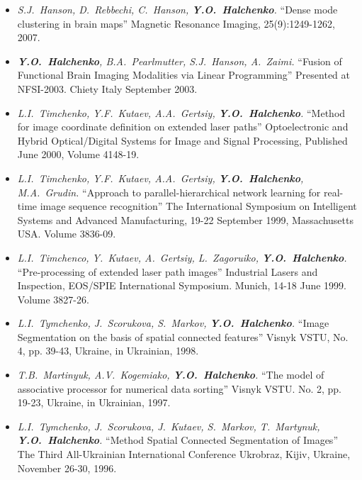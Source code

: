 \documentclass[12pt,overlapped,line]{res}
\newcommand{\mtitle}[1]{``#1''}
\newcommand{\mauthors}[1]{ \textit{#1.}}
\newcommand{\mwhere}[1]{#1.}
\begin{document}
\begin{resume}
\begin{itemize}
  \item
    \mauthors{S.J.~Hanson, D.~Rebbechi, C.~Hanson, \textbf{Y.O.~Halchenko}}
    \mtitle{Dense mode clustering in brain maps}
    \mwhere{Magnetic Resonance Imaging, 25(9):1249-1262, 2007}

  \item
     \mauthors{\textbf{Y.O.~Halchenko}, B.A.~Pearlmutter, S.J.~Hanson, A.~Zaimi}
     \mtitle{Fusion of Functional Brain Imaging Modalities via Linear Programming}
     \mwhere{Presented at NFSI-2003. Chiety Italy September 2003}

  \item
     \mauthors{L.I.~Timchenko, Y.F.~Kutaev, A.A.~Gertsiy, \textbf{Y.O.~Halchenko}}
     \mtitle{Method for image coordinate definition on extended laser paths}
     \mwhere{Optoelectronic and Hybrid Optical/Digital Systems for Image and Signal Processing, Published June 2000,  Volume 4148-19}

  \item
     \mauthors{L.I.~Timchenko, Y.F.~Kutaev, A.A.~Gertsiy, \textbf{Y.O.~Halchenko},
     M.A.~Grudin}
     \mtitle{Approach to parallel-hierarchical network learning for real-time image sequence recognition}
     \mwhere{The International Symposium on Intelligent Systems and Advanced Manufacturing, 19-22 September 1999, Massachusetts USA. Volume 3836-09}

   \item
     \mauthors{L.I.~Timchenco, Y.~Kutaev, A.~Gertsiy, L.~Zagoruiko, \textbf{Y.O.~Halchenko}}
     \mtitle{Pre-processing of extended laser path images}
     \mwhere{Industrial Lasers and Inspection, EOS/SPIE International Symposium. Munich, 14-18 June 1999. Volume 3827-26}

   \item
     \mauthors{L.I.~Tymchenko, J.~Scorukova, S.~Markov, \textbf{Y.O.~Halchenko}}
     \mtitle{Image Segmentation on the basis of spatial connected features}
     \mwhere{Visnyk VSTU, No. 4, pp. 39-43, Ukraine, in Ukrainian, 1998}

   \item
     \mauthors{T.B.~Martinyuk, A.V.~Kogemiako, \textbf{Y.O.~Halchenko}}
     \mtitle{The model of associative processor for numerical data sorting}
     \mwhere{ Visnyk VSTU. No. 2, pp. 19-23, Ukraine, in Ukrainian, 1997}

   \item
     \mauthors{L.I.~Tymchenko, J.~Scorukova, J.~Kutaev, S.~Markov, T.~Martynuk, \textbf{Y.O.~Halchenko}}
     \mtitle{Method Spatial Connected Segmentation of Images}
     \mwhere{The Third All-Ukrainian International Conference Ukrobraz, Kijiv, Ukraine, November 26-30, 1996}
 \end{itemize}


\end{resume}
\end{document}
